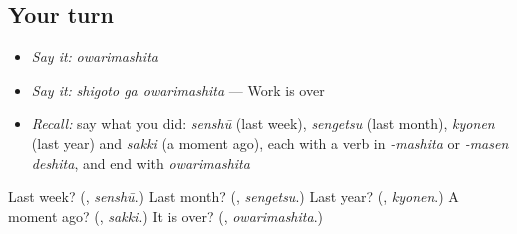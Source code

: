 \subsection*{Your turn}
\begin{itemize}
\raggedright
  \item \emph{Say it:} \emph{owarimashita}
  \item \emph{Say it:} \emph{shigoto ga owarimashita} — Work is over
  \item \emph{Recall:} say what you did: \emph{senshū} (last week), \emph{sengetsu} (last month), \emph{kyonen} (last year) and \emph{sakki} (a moment ago), each with a verb in \emph{-mashita} or \emph{-masen deshita}, and end with \emph{owarimashita}
\end{itemize}

\begin{tcolorbox}[breakable,colback=teal!4,colframe=teal!35!black,title={Before you move on}]
Last week? (\textbf{}, \emph{senshū}.) Last month? (\textbf{}, \emph{sengetsu}.) Last year? (\textbf{}, \emph{kyonen}.) A moment ago? (\textbf{}, \emph{sakki}.) It is over? (\textbf{}, \emph{owarimashita}.)
\end{tcolorbox}
